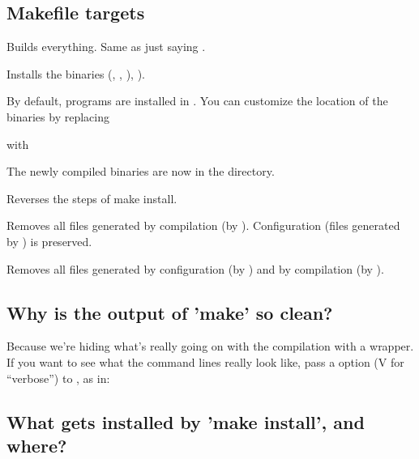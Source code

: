 \subsection{Makefile targets}

\begin{sreitems}{}

\item[\emprog{all}]
  Builds everything. Same as just saying .

\item[\emprog{install}] 
  Installs the binaries (, , ), ).

  By default, programs are installed in
  . 
  You can customize the location of the binaries by replacing
  
  
  with
  
  
  The newly compiled binaries are now in the
   directory.\\
  
\item[\emprog{uninstall}]
  Reverses the steps of make install. 


\item[\emprog{clean}]
  Removes all files generated by compilation (by
  ). Configuration (files generated by
  ) is preserved.

\item[\emprog{distclean}]
  Removes all files generated by configuration (by )
  and by compilation (by ). 

\end{sreitems}

\subsection{Why is the output of 'make' so clean?}

Because we're hiding what's really going on with the compilation with
a wrapper.  If you want to see what the command lines really look
like, pass a  option (V for ``verbose'') to ,
as in:


\subsection{What gets installed by 'make install', and where?}

